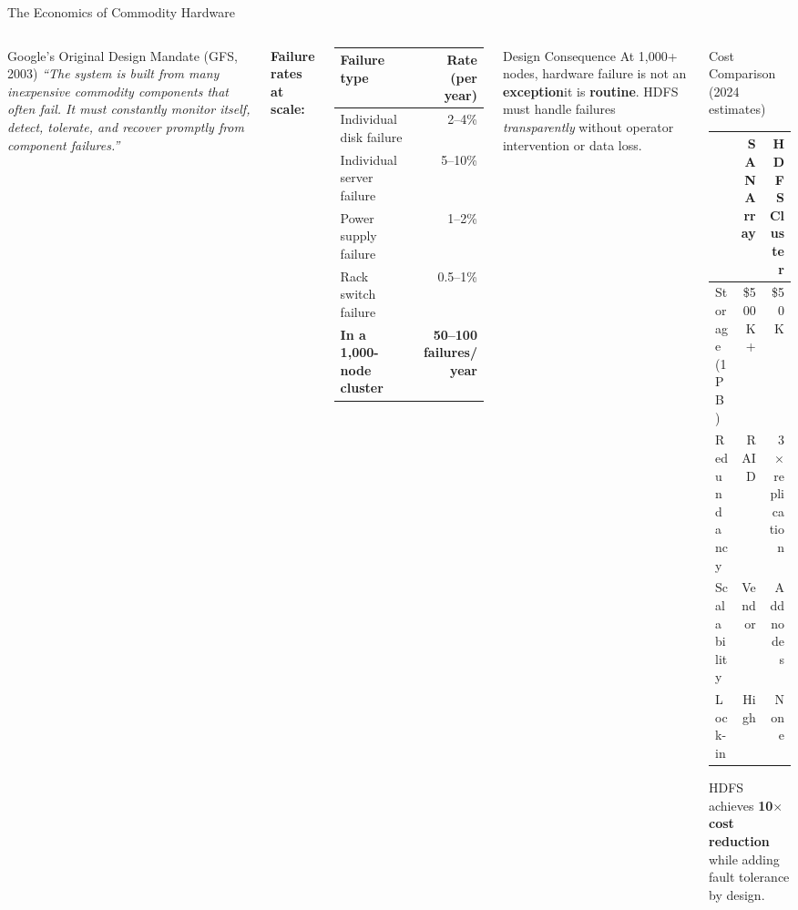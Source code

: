 \documentclass[aspectratio=169,10pt]{beamer}
\begin{document}
\begin{frame}{The Economics of Commodity Hardware}
  \begin{columns}[T]
      \begin{block}{Google's Original Design Mandate (GFS, 2003)}
        \textit{``The system is built from many inexpensive commodity components that often fail.  It must constantly monitor itself, detect, tolerate, and recover promptly from component failures.''}
      \end{block}
      \vspace{6pt}
      \textbf{Failure rates at scale:}
      \vspace{4pt}
      \renewcommand{\arraystretch}{1.2}
      \begin{tabular}{lr}
        \toprule
        \textbf{Failure type} & \textbf{Rate (per year)} \\
        \midrule
        Individual disk failure    & 2--4\% \\
        Individual server failure  & 5--10\% \\
        Power supply failure       & 1--2\% \\
        Rack switch failure        & 0.5--1\% \\
        \midrule
        \textbf{In a 1{,}000-node cluster} & \textbf{50--100 failures/year} \\
        \bottomrule
      \end{tabular}

      \begin{alertblock}{Design Consequence}
        At 1{,}000+ nodes, hardware failure is not an \textbf{exception}\textemdash it is \textbf{routine}.  HDFS must handle failures \emph{transparently} without operator intervention or data loss.
      \end{alertblock}
      \vspace{6pt}
      \begin{exampleblock}{Cost Comparison (2024 estimates)}
        \small
        \begin{tabular}{lrr}
          \toprule
          & \textbf{SAN Array} & \textbf{HDFS Cluster} \\
          \midrule
          Storage (1 PB)  & \$500K+ & \$50K \\
          Redundancy      & RAID     & 3$\times$ replication \\
          Scalability     & Vendor   & Add nodes\\
          Lock-in         & High     & None \\
          \bottomrule
        \end{tabular}
        \vspace{4pt}
        HDFS achieves \textbf{10$\times$ cost reduction} while adding fault tolerance by design.
      \end{exampleblock}
  \end{columns}
\end{frame}
\end{document}
